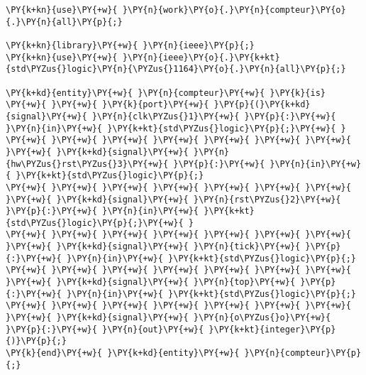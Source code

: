 \begin{Verbatim}[commandchars=\\\{\}]
\PY{k+kn}{use}\PY{+w}{ }\PY{n}{work}\PY{o}{.}\PY{n}{compteur}\PY{o}{.}\PY{n}{all}\PY{p}{;}

\PY{k+kn}{library}\PY{+w}{ }\PY{n}{ieee}\PY{p}{;}
\PY{k+kn}{use}\PY{+w}{ }\PY{n}{ieee}\PY{o}{.}\PY{k+kt}{std\PYZus{}logic}\PY{n}{\PYZus{}1164}\PY{o}{.}\PY{n}{all}\PY{p}{;}

\PY{k+kd}{entity}\PY{+w}{ }\PY{n}{compteur}\PY{+w}{ }\PY{k}{is}
\PY{+w}{ }\PY{+w}{ }\PY{k}{port}\PY{+w}{ }\PY{p}{(}\PY{k+kd}{signal}\PY{+w}{ }\PY{n}{clk\PYZus{}1}\PY{+w}{ }\PY{p}{:}\PY{+w}{ }\PY{n}{in}\PY{+w}{ }\PY{k+kt}{std\PYZus{}logic}\PY{p}{;}\PY{+w}{ }
\PY{+w}{ }\PY{+w}{ }\PY{+w}{ }\PY{+w}{ }\PY{+w}{ }\PY{+w}{ }\PY{+w}{ }\PY{+w}{ }\PY{k+kd}{signal}\PY{+w}{ }\PY{n}{hw\PYZus{}rst\PYZus{}3}\PY{+w}{ }\PY{p}{:}\PY{+w}{ }\PY{n}{in}\PY{+w}{ }\PY{k+kt}{std\PYZus{}logic}\PY{p}{;}
\PY{+w}{ }\PY{+w}{ }\PY{+w}{ }\PY{+w}{ }\PY{+w}{ }\PY{+w}{ }\PY{+w}{ }\PY{+w}{ }\PY{k+kd}{signal}\PY{+w}{ }\PY{n}{rst\PYZus{}2}\PY{+w}{ }\PY{p}{:}\PY{+w}{ }\PY{n}{in}\PY{+w}{ }\PY{k+kt}{std\PYZus{}logic}\PY{p}{;}\PY{+w}{ }
\PY{+w}{ }\PY{+w}{ }\PY{+w}{ }\PY{+w}{ }\PY{+w}{ }\PY{+w}{ }\PY{+w}{ }\PY{+w}{ }\PY{k+kd}{signal}\PY{+w}{ }\PY{n}{tick}\PY{+w}{ }\PY{p}{:}\PY{+w}{ }\PY{n}{in}\PY{+w}{ }\PY{k+kt}{std\PYZus{}logic}\PY{p}{;}
\PY{+w}{ }\PY{+w}{ }\PY{+w}{ }\PY{+w}{ }\PY{+w}{ }\PY{+w}{ }\PY{+w}{ }\PY{+w}{ }\PY{k+kd}{signal}\PY{+w}{ }\PY{n}{top}\PY{+w}{ }\PY{p}{:}\PY{+w}{ }\PY{n}{in}\PY{+w}{ }\PY{k+kt}{std\PYZus{}logic}\PY{p}{;}
\PY{+w}{ }\PY{+w}{ }\PY{+w}{ }\PY{+w}{ }\PY{+w}{ }\PY{+w}{ }\PY{+w}{ }\PY{+w}{ }\PY{k+kd}{signal}\PY{+w}{ }\PY{n}{o\PYZus{}o}\PY{+w}{ }\PY{p}{:}\PY{+w}{ }\PY{n}{out}\PY{+w}{ }\PY{k+kt}{integer}\PY{p}{)}\PY{p}{;}
\PY{k}{end}\PY{+w}{ }\PY{k+kd}{entity}\PY{+w}{ }\PY{n}{compteur}\PY{p}{;}


\end{Verbatim}
